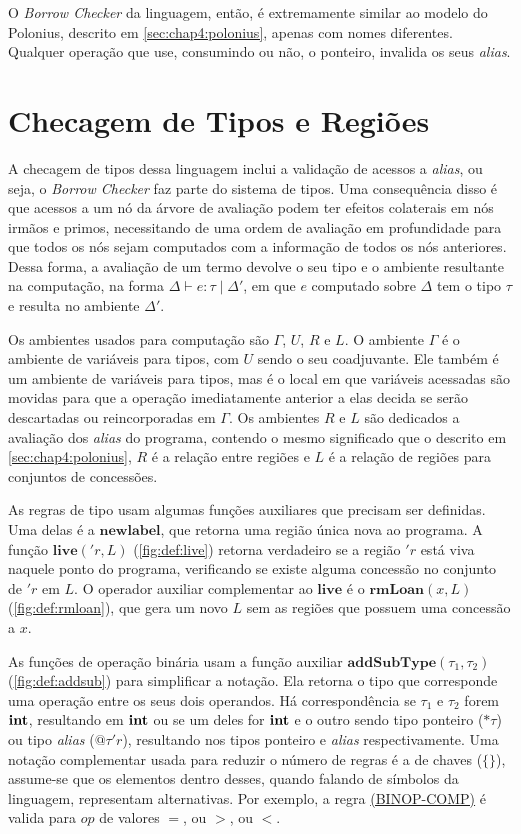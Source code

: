 O \emph{Borrow Checker} da linguagem, então, é extremamente similar ao modelo do Polonius, descrito em \ref{sec:chap4:polonius}, apenas com nomes diferentes. Qualquer operação que use, consumindo ou não, o ponteiro, invalida os seus \emph{alias}.
\section{Checagem de Tipos e Regiões}

A checagem de tipos dessa linguagem inclui a validação de acessos a \emph{alias}, ou seja, o \emph{Borrow Checker} faz parte do sistema de tipos. Uma consequência disso é que acessos a um nó da árvore de avaliação podem ter efeitos colaterais em nós irmãos e primos, necessitando de uma ordem de avaliação em profundidade para que todos os nós sejam computados com a informação de todos os nós anteriores. Dessa forma, a avaliação de um termo devolve o seu tipo e o ambiente resultante na computação, na forma $\Delta \vdash e : \tau\;|\;\Delta'$, em que $e$ computado sobre $\Delta$ tem o tipo $\tau$ e resulta no ambiente $\Delta'$.

Os ambientes usados para computação são $\Gamma$, $U$, $R$ e $L$. O ambiente $\Gamma$ é o ambiente de variáveis para tipos, com $U$ sendo o seu coadjuvante. Ele também é um ambiente de variáveis para tipos, mas é o local em que variáveis acessadas são movidas para que a operação imediatamente anterior a elas decida se serão descartadas ou reincorporadas em $\Gamma$. Os ambientes $R$ e $L$ são dedicados a avaliação dos \emph{alias} do programa, contendo o mesmo significado que o descrito em \ref{sec:chap4:polonius}, $R$ é a relação entre regiões e $L$ é a relação de regiões para conjuntos de concessões. 

As regras de tipo usam algumas funções auxiliares que precisam ser definidas. Uma delas é a $\mathbf{newlabel}$, que retorna uma região única nova ao programa. A função $\mathbf{live}('r, L)$ (\ref{fig:def:live}) retorna verdadeiro se a região $'r$ está viva naquele ponto do programa, verificando se existe alguma concessão no conjunto de $'r$ em $L$. O operador auxiliar complementar ao $\mathbf{live}$ é o $\mathbf{rmLoan}(x, L)$ (\ref{fig:def:rmloan}), que gera um novo $L$ sem as regiões que possuem uma concessão a $x$.

As funções de operação binária usam a função auxiliar $\mathbf{addSubType}(\tau_1, \tau_2)$ (\ref{fig:def:addsub}) para simplificar a notação. Ela retorna o tipo que corresponde uma operação entre os seus dois operandos. Há correspondência se $\tau_1$ e $\tau_2$ forem $\mathbf{int}$, resultando em $\mathbf{int}$ ou se um deles for $\mathbf{int}$ e o outro sendo tipo ponteiro ($\text{*}\!\tau$) ou tipo \emph{alias} ($@\tau'r$), resultando nos tipos ponteiro e \emph{alias} respectivamente. Uma notação complementar usada para reduzir o número de regras é a de chaves ($\{\}$), assume-se que os elementos dentro desses, quando falando de símbolos da linguagem, representam alternativas. Por exemplo, a regra \hyperref[trule:binop-comp]{(BINOP-COMP)} é valida para $op$ de valores $=$, ou $>$, ou $<$.

